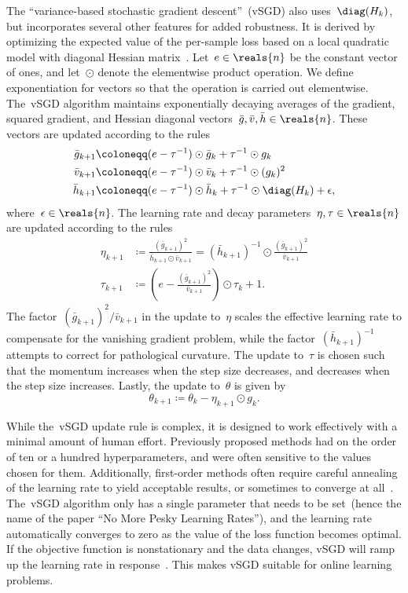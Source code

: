 \documentclass[11pt,a4paper]{article}
\numberwithin{equation}{section}
\begin{document}
The ``variance-based stochastic gradient descent''~(vSGD) also
uses~$\diag(H_k)$, but incorporates several other features for added robustness.
It is derived by optimizing the expected value of the per-sample loss based on a
local quadratic model with diagonal Hessian matrix~\citep{schaul-icml-13}.
Let~$e \in \reals{n}$ be the constant vector of ones, and let~$\odot$ denote the
elementwise product operation. We define exponentiation for vectors so that the
operation is carried out elementwise. The~vSGD algorithm maintains exponentially
decaying averages of the gradient, squared gradient, and Hessian diagonal
vectors~$\bar{g}, \bar{v}, \bar{h} \in \reals{n}$. These vectors are updated
according to the rules
\begin{align*}
	\bar{g}_{k + 1} &\coloneqq (e - \tau^{-1}) \odot \bar{g}_k + \tau^{-1} \odot g_k \\
	\bar{v}_{k + 1} &\coloneqq (e - \tau^{-1}) \odot \bar{v}_k + \tau^{-1} \odot (g_k)^2 \\
	\bar{h}_{k + 1} &\coloneqq (e - \tau^{-1}) \odot \bar{h}_k + \tau^{-1} \odot \diag(H_k)
		+ \epsilon,
\end{align*}
where~$\epsilon \in \reals{n}$. The learning rate and decay parameters~$\eta,
\tau \in \reals{n}$ are updated according to the rules
\begin{align*}
	\eta_{k + 1} &\coloneqq \frac{(\bar{g}_{k + 1})^2}
		{\bar{h}_{k + 1} \odot \bar{v}_{k + 1}}
	= (\bar{h}_{k + 1})^{-1} \odot
		\frac{(\bar{g}_{k + 1})^2}{\bar{v}_{k + 1}} \\
	\tau_{k + 1} &\coloneqq \left( e - \frac{(\bar{g}_{k + 1})^2}{\bar{v}_{k + 1}} \right)
		\odot \tau_k + 1.
\end{align*}
The factor~$(\bar{g}_{k + 1})^2 / \bar{v}_{k + 1}$ in the update to~$\eta$
scales the effective learning rate to compensate for the vanishing gradient
problem, while the factor~$(\bar{h}_{k + 1})^{-1}$ attempts to correct for
pathological curvature. The update to~$\tau$ is chosen such that the momentum
increases when the step size decreases, and decreases when the step size
increases. Lastly, the update to~$\theta$ is given by
\[
	\theta_{k + 1} \coloneqq \theta_k - \eta_{k + 1} \odot g_k.
\]

While the~vSGD update rule is complex, it is designed to work effectively with a
minimal amount of human effort. Previously proposed methods had on the order of
ten or a hundred hyperparameters, and were often sensitive to the values chosen
for them. Additionally, first-order methods often require careful annealing of
the learning rate to yield acceptable results, or sometimes to converge at
all~\citep{krizhevsky2012imagenet}. The~vSGD algorithm only has a single
parameter that needs to be set~(hence the name of the paper ``No More Pesky
Learning Rates''), and the learning rate automatically converges to zero as the
value of the loss function becomes optimal. If the objective function is
nonstationary and the data changes, vSGD will ramp up the learning rate in
response~\citep{schaul-icml-13}. This makes vSGD suitable for online learning
problems.
\end{document}
